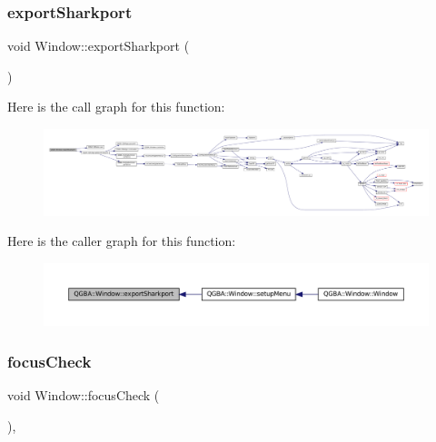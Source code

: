 \subsubsection{\texorpdfstring{export\+Sharkport}{exportSharkport}}
{\footnotesize\ttfamily void Window\+::export\+Sharkport (\begin{DoxyParamCaption}{ }\end{DoxyParamCaption})\hspace{0.3cm}{\ttfamily [slot]}}

Here is the call graph for this function\+:
\nopagebreak
\begin{figure}[H]
\begin{center}
\leavevmode
\includegraphics[width=350pt]{class_q_g_b_a_1_1_window_a22981b021419ff73e53ec7e1cbf661b9_cgraph}
\end{center}
\end{figure}
Here is the caller graph for this function\+:
\nopagebreak
\begin{figure}[H]
\begin{center}
\leavevmode
\includegraphics[width=350pt]{class_q_g_b_a_1_1_window_a22981b021419ff73e53ec7e1cbf661b9_icgraph}
\end{center}
\end{figure}
\mbox{\label{class_q_g_b_a_1_1_window_a39a941c33d3f50cbb26819448366578d}} 
\subsubsection{\texorpdfstring{focus\+Check}{focusCheck}}
{\footnotesize\ttfamily void Window\+::focus\+Check (\begin{DoxyParamCaption}{ }\end{DoxyParamCaption})\hspace{0.3cm}{\ttfamily [private]}, {\ttfamily [slot]}}

